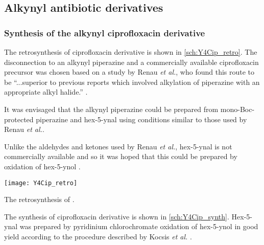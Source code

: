 \subsection{Alkynyl antibiotic derivatives}

\subsubsection{Synthesis of the alkynyl ciprofloxacin derivative \label{sec:Y4Cip}}

The retrosynthesis of ciprofloxacin derivative  is shown in \ref{sch:Y4Cip_retro}. The disconnection to an alkynyl piperazine  and a commercially available ciprofloxacin precursor  was chosen based on a study by Renau \textit{et al.}, who found this route to be ``...superior to previous reports which involved alkylation of piperazine with an appropriate alkyl halide.'' \cite{Renau1996,JPS:JPS2600571210}. 

It was envisaged that the alkynyl piperazine  could be prepared from mono-Boc-protected piperazine  and hex-5-ynal  using conditions similar to those used by Renau \textit{et al.}\cite{Renau1996}.

Unlike the aldehydes and ketones used by Renau \textit{et al.}\cite{Renau1996}, hex-5-ynal  is not commercially available and so it was hoped that this could be prepared by oxidation of hex-5-ynol .


\begin{scheme}[H]
	\begin{center}
		\texttt{[image: Y4Cip\_retro]}
		\caption{The retrosynthesis of . \label{sch:Y4Cip_retro}}
	\end{center}
\end{scheme}


The synthesis of ciprofloxacin derivative  is shown in \ref{sch:Y4Cip_synth}. Hex-5-ynal  was prepared by pyridinium chlorochromate oxidation of hex-5-ynol  in good yield according to the procedure described by Kocsis \textit{et al.} \cite{Kocsis2012}. 

